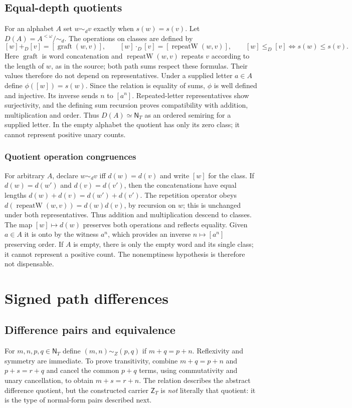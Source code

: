 \documentclass[11pt,reqno]{amsart}
\theoremstyle{definition}\newtheorem{definition}[theorem]{Definition}
\theoremstyle{remark}\newtheorem{remark}[theorem]{Remark}
\newcommand{\N}{\mathsf N_T}\newcommand{\Z}{\mathsf Z_T}\newcommand{\Q}{\mathsf Q_T}\newcommand{\RR}{\mathsf R}
\begin{document}
\subsection{Equal-depth quotients}\label{main:sub-09}
For an alphabet $A$ set $w\sim_d v$ exactly when $s(w)=s(v)$. Let $D(A)=A^{<\omega}/\!\sim_d$. The operations on classes are defined by
\[
 [w]+_D[v]=[\operatorname{graft}(w,v)],\qquad
 [w]\cdot_D[v]=[\operatorname{repeatW}(w,v)],\qquad
 [w]\le_D[v]\iff s(w)\le s(v).
\]
Here $\operatorname{graft}$ is word concatenation and $\operatorname{repeatW}(w,v)$ repeats $v$ according to the length of $w$, as in the source; both path sums respect these formulas. Their values therefore do not depend on representatives. Under a supplied letter $a\in A$ define $\phi([w])=s(w)$. Since the relation is equality of sums, $\phi$ is well defined and injective. Its inverse sends $n$ to $[a^n]$. Repeated-letter representatives show surjectivity, and the defining sum recursion proves compatibility with addition, multiplication and order. Thus $D(A)\simeq\N$ as an ordered semiring for a supplied letter. In the empty alphabet the quotient has only its zero class; it cannot represent positive unary counts.


\medskip
\subsubsection*{Quotient operation congruences}\label{supp:4-4}
For arbitrary $A$, declare $w\sim_d v$ iff $d(w)=d(v)$ and write $[w]$ for the class. If $d(w)=d(w')$ and $d(v)=d(v')$, then the concatenations have equal lengths $d(w)+d(v)=d(w')+d(v')$. The repetition operator obeys $d(\operatorname{repeatW}(w,v))=d(w)d(v)$, by recursion on $w$; this is unchanged under both representatives. Thus addition and multiplication descend to classes. The map $[w]\mapsto d(w)$ preserves both operations and reflects equality. Given $a\in A$ it is onto by the witness $a^n$, which provides an inverse $n\mapsto[a^n]$ preserving order. If $A$ is empty, there is only the empty word and its single class; it cannot represent a positive count. The nonemptiness hypothesis is therefore not dispensable.
\medskip

\clearpage
\section{Signed path differences}\label{sec:integers}
\subsection{Difference pairs and equivalence}\label{main:sub-10}
For $m,n,p,q\in\N$ define $(m,n)\sim_Z(p,q)$ if $m+q=p+n$. Reflexivity and symmetry are immediate. To prove transitivity, combine $m+q=p+n$ and $p+s=r+q$ and cancel the common $p+q$ terms, using commutativity and unary cancellation, to obtain $m+s=r+n$. The relation describes the abstract difference quotient, but the constructed carrier $\Z$ is \emph{not} literally that quotient: it is the type of normal-form pairs described next.
\end{document}
